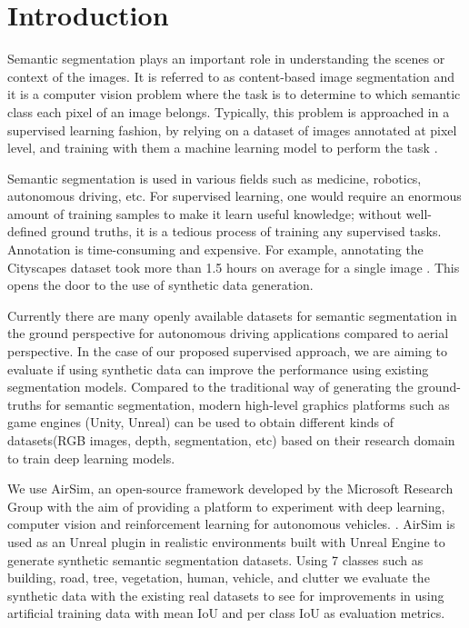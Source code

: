 \documentclass[../report.tex]{subfiles}
\begin{document}
    \section{Introduction}
    \label{sec:introduction}
    Semantic segmentation plays an important role in understanding the scenes or context of the images. It is referred to as content-based image segmentation and it is a computer vision problem where the task is to determine to which semantic class each pixel of an image belongs. Typically, this problem is approached in a supervised learning fashion, by relying on a dataset of images annotated at pixel level, and training with them a machine learning model to perform the task \cite{csurka2022semantic}. 
    
    Semantic segmentation is used in various fields such as medicine, robotics, autonomous driving, etc. For supervised learning, one would require an enormous amount of training samples to make it learn useful knowledge; without well-defined ground truths, it is a tedious process of training any supervised tasks. Annotation is time-consuming and expensive. For example, annotating the Cityscapes dataset took more than 1.5 hours on average for a single image \cite{cordts2016cityscapes}. This opens the door to the use of synthetic data generation. 
    
    Currently there are many openly available datasets for semantic segmentation in the ground perspective for autonomous driving applications compared to aerial perspective. In the case of our proposed supervised approach, we are aiming to evaluate if using synthetic data can improve the performance using existing segmentation models. Compared to the traditional way of generating the ground-truths for semantic segmentation, modern high-level graphics platforms such as game engines (Unity, Unreal) can be used to obtain different kinds of datasets(RGB images, depth, segmentation, etc) based on their research domain to train deep learning models.
    
    We use AirSim, an open-source framework developed by the Microsoft Research Group with the aim of providing a platform to experiment with deep learning, computer vision and reinforcement learning for autonomous vehicles. \cite{shah2018airsim}.
    AirSim is used as an Unreal plugin in realistic environments built with Unreal Engine to generate synthetic semantic segmentation datasets. Using 7 classes such as building, road, tree, vegetation, human, vehicle, and clutter we evaluate the synthetic data with the existing real datasets to see for improvements in using artificial training data with mean IoU and per class IoU as evaluation metrics.  
    
\end{document}
